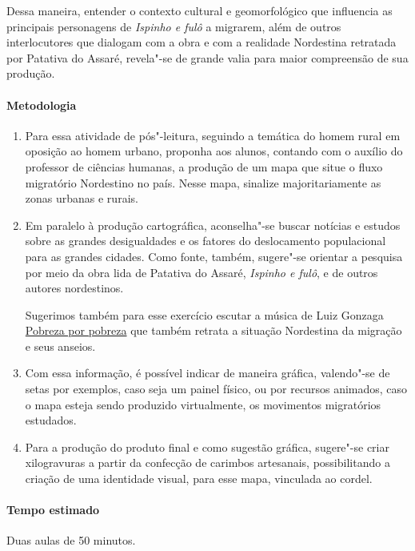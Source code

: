 \documentclass[12pt]{extarticle}
\begin{document}
Dessa maneira, entender o contexto cultural e geomorfológico que influencia as principais personagens 
de \emph{Ispinho e fulô} a migrarem, além de outros interlocutores que dialogam com a obra e com a 
realidade Nordestina retratada por Patativa do Assaré, revela"-se de grande valia para maior compreensão 
de sua produção.

\paragraph{Metodologia}

\begin{enumerate}
\item
Para essa atividade de pós"-leitura, seguindo a temática do homem rural em oposição ao homem urbano, 
proponha aos alunos, contando com o auxílio do professor de ciências humanas, a produção de um mapa 
que situe o fluxo migratório Nordestino no país. Nesse mapa, sinalize majoritariamente as zonas urbanas e rurais. 

\item
Em paralelo à produção cartográfica, aconselha"-se buscar notícias e estudos sobre as grandes desigualdades 
e os fatores do deslocamento populacional para as grandes cidades.
Como fonte, também, sugere"-se orientar a pesquisa por meio da obra lida de
Patativa do Assaré, \emph{Ispinho e fulô}, e de outros autores nordestinos.

Sugerimos também para esse exercício escutar a música de Luiz Gonzaga \href{https://www.youtube.com/watch?v=L9WSaMi2QhA&ab_channel=LuizGonzaga-Topic}{Pobreza por pobreza} 
que também retrata a situação Nordestina da migração e seus anseios. 

\item
Com essa informação, é possível indicar de maneira gráfica, valendo"-se de setas por exemplos,
caso seja um painel físico, ou por recursos animados, caso o mapa esteja
sendo produzido virtualmente, os movimentos migratórios estudados. 

\item
Para a produção do produto final e como sugestão gráfica, sugere"-se criar xilogravuras a partir da
confecção de carimbos artesanais, possibilitando a criação de uma identidade visual, para esse mapa, vinculada ao cordel.

\end{enumerate}

\paragraph{Tempo estimado} Duas aulas de 50 minutos. 
\end{document}
